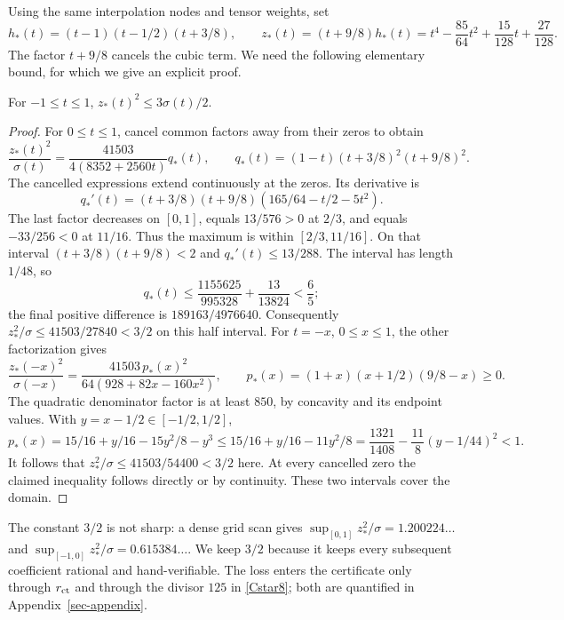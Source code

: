 Using the same interpolation nodes and tensor weights, set
\[
 h_*(t)=(t-1)(t-1/2)(t+3/8),\qquad
 z_*(t)=(t+9/8)h_*(t)
       =t^4-\frac{85}{64}t^2+\frac{15}{128}t+\frac{27}{128}.
\]
The factor $t+9/8$ cancels the cubic term. We need the following elementary
bound, for which we give an explicit proof.
\begin{lemma}\label{contact-square}
For $-1\le t\le1$, $z_*(t)^2\le3\sigma(t)/2$.
\end{lemma}
\begin{proof}
For $0\le t\le1$, cancel common factors away from their zeros to obtain
\[
 \frac{z_*(t)^2}{\sigma(t)}
  =\frac{41503}{4(8352+2560t)}q_*(t),\qquad
 q_*(t)=(1-t)(t+3/8)^2(t+9/8)^2.
\]
The cancelled expressions extend continuously at the zeros. Its derivative is
\[
 q_*'(t)=(t+3/8)(t+9/8)(165/64-t/2-5t^2).
\]
The last factor decreases on $[0,1]$, equals $13/576>0$ at $2/3$,
and equals $-33/256<0$ at $11/16$. Thus the maximum is within
$[2/3,11/16]$. On that interval $(t+3/8)(t+9/8)<2$ and
$q_*'(t)\le13/288$. The interval has length $1/48$, so
\[
 q_*(t)\le\frac{1155625}{995328}+\frac{13}{13824}<\frac65;
\]
the final positive difference is $189163/4976640$.
Consequently $z_*^2/\sigma\le41503/27840<3/2$ on this half interval.
For $t=-x$, $0\le x\le1$, the other factorization gives
\[
 \frac{z_*(-x)^2}{\sigma(-x)}
 =\frac{41503\,p_*(x)^2}{64(928+82x-160x^2)},\qquad
 p_*(x)=(1+x)(x+1/2)(9/8-x)\ge0.
\]
The quadratic denominator factor is at least $850$, by concavity and its
endpoint values. With $y=x-1/2\in[-1/2,1/2]$,
\[
 p_*(x)=15/16+y/16-15y^2/8-y^3
 \le15/16+y/16-11y^2/8
 =\frac{1321}{1408}-\frac{11}{8}(y-1/44)^2<1.
\]
It follows that $z_*^2/\sigma\le41503/54400<3/2$ here.
At every cancelled zero the claimed inequality follows directly or by
continuity. These two intervals cover the domain.
\end{proof}

\begin{remark}\label{rem-theta}
The constant $3/2$ is not sharp: a dense grid scan gives
$\sup_{[0,1]}z_*^2/\sigma=1.200224\ldots$ and
$\sup_{[-1,0]}z_*^2/\sigma=0.615384\ldots$. We keep $3/2$ because it keeps
every subsequent coefficient rational and hand-verifiable. The loss enters
the certificate only through $r_{\rm ct}$ and through the divisor $125$ in
\eqref{Cstar8}; both are quantified in Appendix~\ref{sec-appendix}.
\end{remark}

